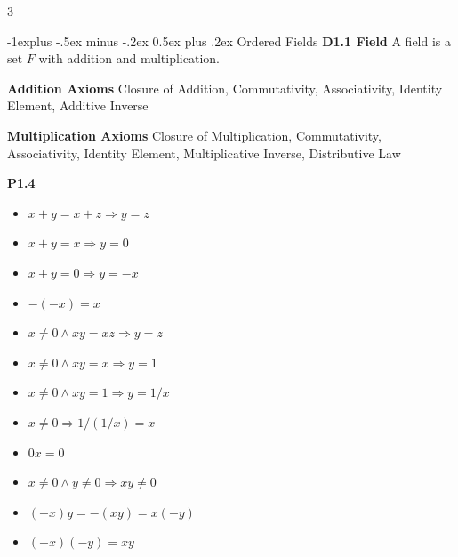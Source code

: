 \documentclass[10pt, landscape]{article}
\makeatletter
\renewcommand{\section}{\@startsection{section}{1}{0mm}%
                                {-1ex plus -.5ex minus -.2ex}%
                                {0.5ex plus .2ex}%
                                {\normalfont\large\bfseries}}
\renewcommand{\section}{\@startsection{section}{2}{0mm}%
                                {-1explus -.5ex minus -.2ex}%
                                {0.5ex plus .2ex}%
                                {\normalfont\normalsize\bfseries}}
\makeatother
\begin{document}
\raggedright
\footnotesize
\begin{multicols*}{3}

\setlength{\columnseprule}{0.25pt}
\setlength{\premulticols}{1pt}
\setlength{\postmulticols}{1pt}
\setlength{\multicolsep}{1pt}
\setlength{\columnsep}{2pt}

\begin{center}
\end{center}

\section{Ordered Fields}
\textbf{D1.1 Field} A field is a set $F$ with addition and multiplication.

\textbf{Addition Axioms} Closure of Addition, Commutativity, Associativity, Identity Element, Additive Inverse

\textbf{Multiplication Axioms} Closure of Multiplication, Commutativity, Associativity, Identity Element, Multiplicative Inverse, Distributive Law

\textbf{P1.4}
\begin{itemize}
    \item $x+y=x+z \Rightarrow y = z$
    \item $x+y=x \Rightarrow y = 0$
    \item $x+y = 0 \Rightarrow y = -x$
    \item $-(-x)=x$
    \item $x \neq 0 \land xy = xz \Rightarrow y  = z$
    \item $x \neq 0 \land xy = x \Rightarrow y = 1$
    \item $x \neq 0 \land xy = 1 \Rightarrow y = 1/x$
    \item $x \neq 0 \Rightarrow1/(1/x) = x$
    \item $0x = 0$
    \item $x \neq 0 \land y \neq 0 \Rightarrow xy \neq 0$
    \item $(-x)y=-(xy)=x(-y)$
    \item $(-x)(-y)=xy$
\end{itemize}


\end{multicols*}
\end{document}
